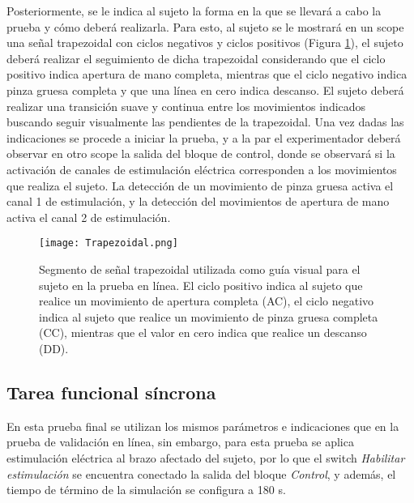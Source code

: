 \newpage
Posteriormente, se le indica al sujeto la forma en la que se llevará a cabo la prueba y cómo deberá realizarla. Para esto, al sujeto se le mostrará en un scope una señal trapezoidal con ciclos negativos y ciclos positivos (Figura \ref{Figura: Trapezoidal}), el sujeto deberá realizar el seguimiento de dicha trapezoidal considerando que el ciclo positivo indica apertura de mano completa, mientras que el ciclo negativo indica pinza gruesa completa y que una línea en cero indica descanso. El sujeto deberá realizar una transición suave y continua entre los movimientos indicados buscando seguir visualmente las pendientes de la trapezoidal. Una vez dadas las indicaciones se procede a iniciar la prueba, y a la par el experimentador deberá observar en otro scope la salida del bloque de control, donde se observará si la activación de canales de estimulación eléctrica corresponden a los movimientos que realiza el sujeto. La detección de un movimiento de pinza gruesa activa el canal 1 de estimulación, y la detección del movimientos de apertura de mano activa el canal 2 de estimulación.

\vfill
\begin{figure}[htbp]
	\centering
	\texttt{[image: Trapezoidal.png]}
	\caption[Segmento de señal trapezoidal patrón]{Segmento de señal trapezoidal utilizada como guía visual para el sujeto en la prueba en línea. El ciclo positivo indica al sujeto que realice un movimiento de apertura completa (AC), el ciclo negativo indica al sujeto que realice un movimiento de pinza gruesa completa (CC), mientras que el valor en cero indica que realice un descanso (DD).}
	\label{Figura: Trapezoidal}
\end{figure}
\vfill

\newpage
\subsection{Tarea funcional síncrona}\label{Sec: TareaObj}
En esta prueba final se utilizan los mismos parámetros e indicaciones que en la prueba de validación en línea, sin embargo, para esta prueba se aplica estimulación eléctrica al brazo afectado del sujeto, por lo que el switch \emph{Habilitar estimulación} se encuentra conectado la salida del bloque \emph{Control}, y además, el tiempo de término de la simulación se configura a 180 s.

